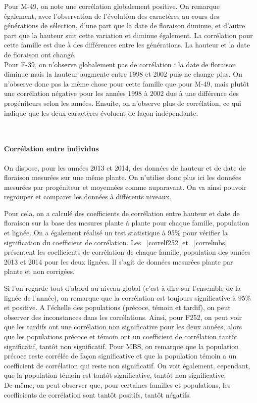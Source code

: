 \documentclass[12pt,a4paper]{article}
\begin{document}
								Pour M-49, on note une corrélation globalement positive. On remarque également, avec l'observation de l'évolution des caractères au cours des générations de sélection, d'une part que la date de floraison diminue, et d'autre part que la hauteur suit cette variation et diminue également.
								La corrélation pour cette famille est due à des différences entre les générations. La hauteur et la date de floraison ont changé.\\
								
								Pour F-39, on n'observe globalement pas de corrélation : la date de floraison diminue mais la hauteur augmente entre 1998 et 2002 puis ne change plus. On n'observe donc pas la même chose pour cette famille que pour M-49, mais plutôt une corrélation négative pour les années 1998 à 2002 due à une différence des progéniteurs selon les années. Ensuite, on n'observe plus de corrélation, ce qui indique que les deux caractères évoluent de façon indépendante.
			 				

			 			~\paragraph{Corrélation entre individus}
			 				
			 				On dispose, pour les années 2013 et 2014, des données de hauteur et de date de floraison mesurées sur une même plante. On n'utilise donc plus ici les données mesurées par progéniteur et moyennées comme auparavant. On va ainsi pouvoir regrouper et comparer les données à différents niveaux.
			 				
			 				Pour cela, on a calculé des coefficients de corrélation entre hauteur et date de floraison sur la base des mesures plante à plante pour chaque famille, population et lignée. On a également réalisé un test statistique à 95\% pour vérifier la signification du coefficient de corrélation. Les ~\ref{correlf252} et ~\ref{correlmbs} présentent les coefficients de corrélation de chaque famille, population des années 2013 et 2014 pour les deux lignées. Il s'agit de données mesurées plante par plante et non corrigées.
			 				
			 				Si l'on regarde tout d'abord au niveau global (c'est à dire sur l'ensemble de la lignée de l'année), on remarque que la corrélation est toujours significative à 95\% et positive. A l'échelle des populations (précoce, témoin et tardif), on peut observer des inconstances dans les corrélations. Ainsi, pour F252, on peut voir que les tardifs ont une corrélation non significative pour les deux années, alors que les populations précoce et témoin ont un coefficient de corrélation tantôt significatif, tantôt non significatif. Pour MBS, on remarque que la population précoce reste corrélée de façon significative et que la population témoin a un coefficient de corrélation qui reste non significatif. On voit également, cependant, que la population témoin est tantôt significative, tantôt non significative.\\
			 				De même, on peut observer que, pour certaines familles et populations, les coefficients de corrélation sont tantôt positifs, tantôt négatifs.\\
			 				
\end{document}
